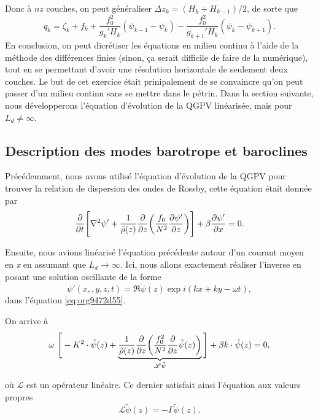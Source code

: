 \documentclass[10pt]{article}
\numberwithin{equation}{section}
\newcommand{\tpsi}{\tilde{\psi}}
\begin{document}
Donc à \(nz\) couches, on peut généraliser \(\Delta z_k = (H_k + H_{k-1})/2\), de sorte que
\begin{equation}
\label{eq:orge5961d9}
q_k = \zeta_k + f_k + \frac{f_0^2}{g_k' H_k}(\psi_{k-1} - \psi_k) - \frac{f_0^2}{g_{k+1}' H_k}(\psi_k - \psi_{k+1}).
\end{equation}
En conclusion, on peut dicrétiser les équations en milieu continu à l'aide de la méthode des différences finies (sinon, ça serait difficile de faire de la numérique), tout en se permettant d'avoir une résolution horizontale de seulement deux couches.
Le but de cet exercice était prinipalement de se convaincre qu'on peut passer d'un milieu continu sans se mettre dans le pétrin.
Dans la section suivante, nous développerons l'équation d'évolution de la QGPV linéarisée, mais pour \(L_d \not = \infty\).

\subsection{Description des modes barotrope et baroclines}
\label{sec:orgc312dd3}
Précédemment, nous avons utilisé l'équation d'évolution de la QGPV pour trouver la relation de dispersion des ondes de Rossby, cette équation était donnée par
\begin{equation}
\label{eq:org9472d55}
\pdv{t} \Bigg[ \laplacian \psi' + \frac{1}{\tilde{\rho}(z)}\pdv{z}\qty(\frac{f_0}{N^2}\pdv{\psi'}{z}) \Bigg] + \beta \pdv{\psi'}{x} = 0.
\end{equation}

Ensuite, nous avions linéarisé l'équation précédente autour d'un courant moyen en \emph{x} en assumant que \(L_d \rightarrow \infty\).
Ici, nous allons exactement réaliser l'inverse en posant une solution oscillante de la forme
\begin{equation}
\psi'(x,,y,z,t) = \Re \tpsi(z) \exp{ i(kx + ky - \omega t)},
\end{equation}
dans l'équation \ref{eq:org9472d55}.\bigskip

On arrive à
\begin{equation}
\label{eq:org5687b53}
\omega\ \Bigg[ - K^2 \cdot \tpsi(z) + \underbrace{\frac{1}{\tilde{\rho}(z)}\pdv{z}\qty(\frac{f_0^2}{N^2} \pdv{z}\tpsi(z))}_{\mathscr{L}\tpsi} \Bigg] + \beta k\cdot \tpsi(z) = 0,
\end{equation}

où \(\mathscr{L}\) est un opérateur linéaire.
Ce dernier satisfait ainsi l'équation aux valeurs propres
\begin{equation}
\mathscr{L}\tpsi(z) = - \Gamma \tpsi(z).
\end{equation}
\end{document}
